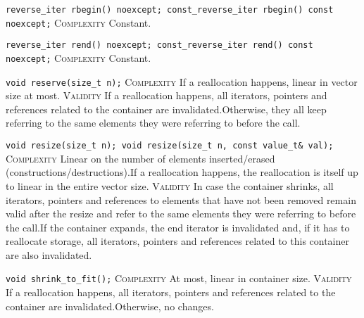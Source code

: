 \noindent{}\hspace*{0.25em}\lstinline[basicstyle=\ttfamily\color{cgreen}]{reverse_iter rbegin() noexcept; const_reverse_iter rbegin() const noexcept;} \textsc{Complexity} Constant.\\\vspace{-0.6em}

\noindent{}\hspace*{0.25em}\lstinline[basicstyle=\ttfamily\color{cgreen}]{reverse_iter rend() noexcept; const_reverse_iter rend() const noexcept;} \textsc{Complexity} Constant.\\\vspace{-0.6em}

\noindent{}\hspace*{0.25em}\lstinline[basicstyle=\ttfamily\color{corange}]{void reserve(size_t n);} \textsc{Complexity} If a reallocation happens, linear in vector size at most. \textsc{Validity} If a reallocation happens, all iterators, pointers and references related to the container are invalidated.Otherwise, they all keep referring to the same elements they were referring to before the call.\\\vspace{-0.6em}

\noindent{}\hspace*{0.25em}\lstinline[basicstyle=\ttfamily\color{corange}]{void resize(size_t n); void resize(size_t n, const value_t& val);} \textsc{Complexity} Linear on the number of elements inserted/erased (constructions/destructions).If a reallocation happens, the reallocation is itself up to linear in the entire vector size. \textsc{Validity} In case the container shrinks, all iterators, pointers and references to elements that have not been removed remain valid after the resize and refer to the same elements they were referring to before the call.If the container expands, the end iterator is invalidated and, if it has to reallocate storage, all iterators, pointers and references related to this container are also invalidated.\\\vspace{-0.6em}

\noindent{}\hspace*{0.25em}\lstinline[basicstyle=\ttfamily\color{corange}]{void shrink_to_fit();} \textsc{Complexity} At most, linear in container size. \textsc{Validity} If a reallocation happens, all iterators, pointers and references related to the container are invalidated.Otherwise, no changes.\\\vspace{-0.6em}

